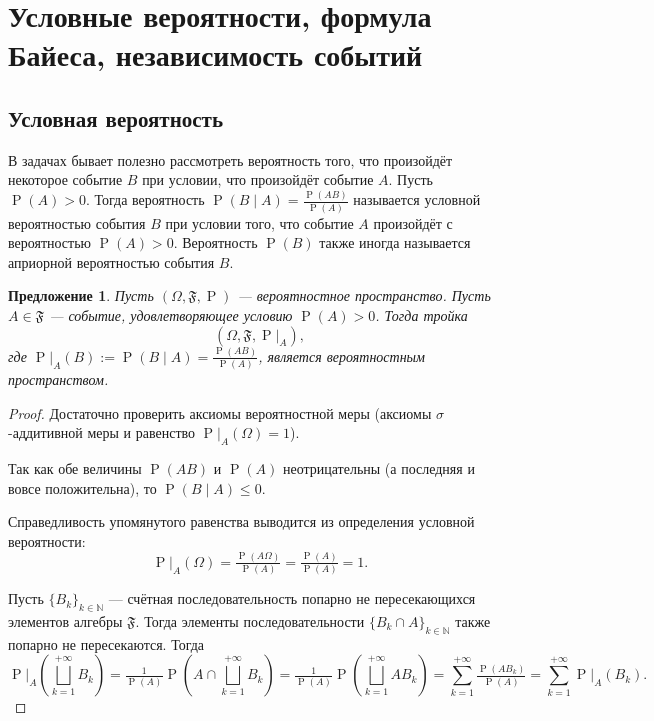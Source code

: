 \documentclass[12pt]{article}
\newtheorem{proposition}[theorem]{Предложение}
\numberwithin{theorem}{section}
\theoremstyle{definition}
\newcommand{\prob}{\operatorname{P}}
\newcommand{\defin}[2]{\hypertarget{#2}{{\color{red} #1}}}
\newcommand{\events}{\mathfrak{F}}
\begin{document}
	\section{Условные вероятности, формула Байеса, независимость событий}
	
	\subsection{Условная вероятность}
	
	В задачах бывает полезно рассмотреть вероятность того, что произойдёт некоторое событие $ B $ при условии, 
	что произойдёт событие $ A $. Пусть $ \prob(A) > 0 $. Тогда вероятность $ \prob(B \mid A) = \tfrac{\prob(AB)}{\prob(A)} $
	называется \defin{условной вероятностью события $ B $ при условии того, 
	что событие $ A $ произойдёт с вероятностью $ \prob(A) > 0 $}{conditional}.
	Вероятность $ \prob(B) $ также иногда называется \defin{априорной вероятностью события $ B $}{apriori}.
		
	\begin{proposition}
		Пусть $ (\Omega, \events, \prob) $ --- вероятностное пространство.
		Пусть $ {A \in \events} $ --- событие, удовлетворяющее условию $ \prob(A) > 0 $.
		Тогда тройка $$ (\Omega, \events, \left.\prob\right|_{A}), $$
		где $ \left.\prob\right|_{A}(B) := \prob(B \mid A) = \tfrac{\prob(AB)}{\prob(A)} $,
		является вероятностным пространством.
	\end{proposition}
	
	\begin{proof}
		Достаточно проверить аксиомы вероятностной меры 
		(аксиомы $ \sigma $-аддитивной меры и равенство $ \left.\prob\right|_{A}(\Omega) = 1 $).
		
		Так как обе величины $ \prob(AB) $ и $ \prob(A) $ неотрицательны (а последняя и вовсе положительна),
		то $ \prob(B \mid A) \leqslant 0 $.
		
		Справедливость упомянутого равенства выводится из определения условной вероятности: 
		$$ \left.\prob\right|_{A}(\Omega) = \tfrac{\prob(A\Omega)}{\prob(A)} = \tfrac{\prob(A)}{\prob(A)} = 1. $$
		
		Пусть $ \{B_k\}_{k \in \mathbb{N}} $ --- 
		счётная последовательность попарно не пересекающихся элементов алгебры $ \events $. 
		Тогда элементы последовательности $ \{B_k \cap A\}_{k \in \mathbb{N}} $ также попарно не пересекаются.
		Тогда
		$$ \left.\prob\right|_{A}\left(\bigsqcup\limits_{k = 1}^{+\infty} B_k \right)
		= \tfrac{1}{\prob(A)}\prob\left(A \cap \bigsqcup\limits_{k = 1}^{+\infty} B_k \right)
		= \tfrac{1}{\prob(A)}\prob\left(\bigsqcup\limits_{k = 1}^{+\infty} AB_k \right)
		= \sum\limits_{k = 1}^{+\infty} \tfrac{\prob(AB_k)}{\prob(A)} 
		= \sum\limits_{k = 1}^{+\infty} \left.\prob\right|_{A}(B_k). $$
	\end{proof}
	
\end{document}
